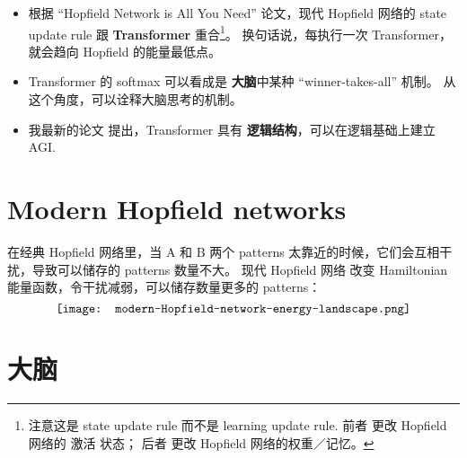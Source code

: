 \begin{preview}
\begin{minipage}{\textwidth}
\begin{itemize}
	\item 根据 ``Hopfield Network is All You Need'' 论文，现代 Hopfield 网络的 state update rule 跟 \textbf{Transformer} 重合\footnote{注意这是 state update rule 而不是 learning update rule.  前者 更改 Hopfield 网络的 激活 状态； 后者 更改 Hopfield 网络的权重／记忆。}。 换句话说，每执行一次 Transformer，就会趋向 Hopfield 的能量最低点。 

	\item Transformer 的 softmax 可以看成是 \textbf{大脑}中某种 ``winner-takes-all'' 机制。 从这个角度，可以诠释大脑思考的机制。
	
	\item 我最新的论文 提出，Transformer 具有 \textbf{逻辑结构}，可以在逻辑基础上建立 AGI.

\end{itemize}

\section{Modern Hopfield networks}

在经典 Hopfield 网络里，当 A 和 B 两个 patterns 太靠近的时候，它们会互相干扰，导致可以储存的 patterns 数量不大。  现代 Hopfield 网络 改变 Hamiltonian 能量函数，令干扰减弱，可以储存数量更多的 patterns：
\begin{equation}
\vcenter{\hbox{\texttt{[image: modern-Hopfield-network-energy-landscape.png]}}}
\end{equation}


\section{大脑}



\end{minipage}
\end{preview}

\begin{comment}
\begin{preview}
\begin{minipage}{\textwidth}
\setlength{\parskip}{0.4\baselineskip}

\begin{textblock*}{20cm}(2.1cm,2cm) %
	{\color{red}{\large \textcircled{\small 2}}}
	\hspace{8cm}
	\color{blue}{\footnotesize \cc{逻辑 Transformer}{Logic Transformer}}
\end{textblock*}
\vspace*{0.3cm} 

\end{minipage}
\end{preview}
\end{comment}


